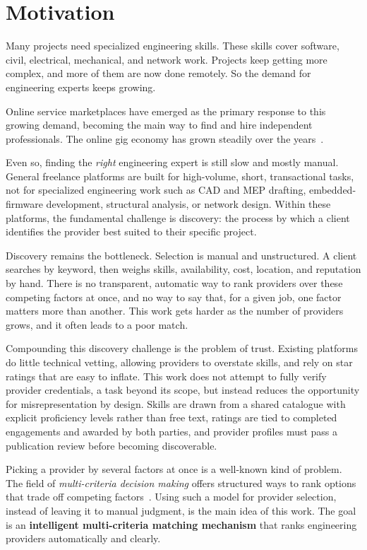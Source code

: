 \label{ch:intro}

\section{Motivation}
Many projects need specialized engineering skills. These skills cover software,
civil, electrical, mechanical, and network work. Projects keep getting more
complex, and more of them are now done remotely. So the demand for engineering
experts keeps growing.

Online service marketplaces have emerged as the primary response to this growing
demand, becoming the main way to find and hire independent professionals. The
online gig economy has grown steadily over the years~\cite{kassi2019online}.

Even so, finding the \textit{right} engineering expert is still slow and mostly
manual. General freelance platforms are built for high-volume, short,
transactional tasks, not for specialized engineering work such as CAD and MEP
drafting, embedded-firmware development, structural analysis, or network design.
Within these platforms, the fundamental challenge is discovery: the process by
which a client identifies the provider best suited to their specific project.

Discovery remains the bottleneck. Selection is manual and unstructured. A client
searches by keyword, then weighs skills, availability, cost, location, and
reputation by hand. There is no transparent, automatic way to rank providers
over these competing factors at once, and no way to say that, for a given job,
one factor matters more than another. This work gets harder as the number of
providers grows, and it often leads to a poor match.

Compounding this discovery challenge is the problem of trust. Existing platforms
do little technical vetting, allowing providers to overstate skills, and rely on
star ratings that are easy to inflate. This work does not attempt to fully
verify provider credentials, a task beyond its scope, but instead reduces the
opportunity for misrepresentation by design. Skills are drawn from a shared
catalogue with explicit proficiency levels rather than free text, ratings are
tied to completed engagements and awarded by both parties, and provider profiles
must pass a publication review before becoming discoverable.

Picking a provider by several factors at once is a well-known kind of problem.
The field of \textit{multi-criteria decision making} offers structured ways to
rank options that trade off competing factors~\cite{triantaphyllou2000multi}.
Using such a model for provider selection, instead of leaving it to manual
judgment, is the main idea of this work. The goal is an \textbf{intelligent
multi-criteria matching mechanism} that ranks engineering providers
automatically and clearly.

